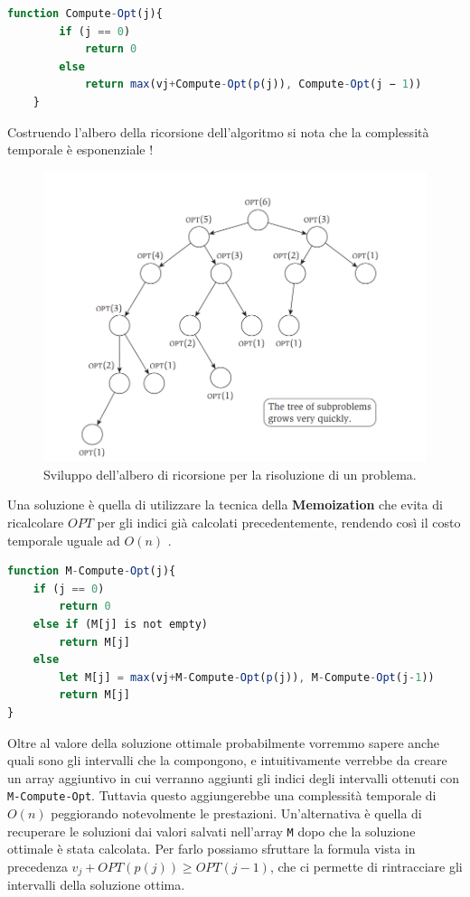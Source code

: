 \begin{lstlisting}[language=Javascript]
    function Compute-Opt(j){
        if (j == 0)
            return 0
        else
            return max(vj+Compute-Opt(p(j)), Compute-Opt(j − 1))
    }
\end{lstlisting}

Costruendo l'albero della ricorsione dell'algoritmo si nota che la complessità
temporale è esponenziale  !

\begin{figure}[H]
    \centering
    \includegraphics[width=12cm, keepaspectratio]{capitoli/imgs/opt_albero.png}
    \caption{Sviluppo dell'albero di ricorsione per la risoluzione di un problema.}
\end{figure}

\pagebreak

Una soluzione è quella di utilizzare la tecnica della \textbf{Memoization} che evita
di ricalcolare $OPT$ per gli indici già calcolati precedentemente, rendendo così
il costo temporale uguale ad $O(n)$ .

\begin{lstlisting}[language=Javascript]
function M-Compute-Opt(j){
    if (j == 0)
        return 0
    else if (M[j] is not empty)
        return M[j]
    else
        let M[j] = max(vj+M-Compute-Opt(p(j)), M-Compute-Opt(j-1))
        return M[j]
}
\end{lstlisting}

Oltre al valore della soluzione ottimale probabilmente vorremmo sapere anche
quali sono gli intervalli che la compongono, e intuitivamente verrebbe da creare
un array aggiuntivo in cui verranno aggiunti gli indici degli intervalli
ottenuti con \verb|M-Compute-Opt|. Tuttavia questo aggiungerebbe una complessità
temporale di $O(n)$ peggiorando notevolmente le prestazioni. Un'alternativa è
quella di recuperare le soluzioni dai valori salvati nell'array \verb|M| dopo che la
soluzione ottimale è stata calcolata. Per farlo possiamo sfruttare la formula
vista in precedenza $v_j + OPT(p(j)) \geq OPT(j-1)$, che ci permette di
rintracciare gli intervalli della soluzione ottima.

